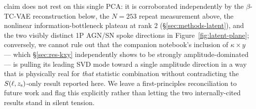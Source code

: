 \documentclass[11pt]{article}
\newcommand{\kappay}{\kappa\times y}
\newcommand{\sez}{S(\ell, z_{\rm s})}
\begin{document}
claim does not rest on this single PCA: it is corroborated independently by
the $\beta$-TC-VAE reconstruction below, the $N=253$ repeat measurement
above, the nonlinear information-bottleneck plateau at rank 2
(\S\ref{sec:methods-latent}), and the two visibly distinct 1P AGN/SN spoke
directions in Figure~\ref{fig:latent-plane}; conversely, we cannot rule out
that the companion notebook's inclusion of $\kappay$ — which
\S\ref{sec:res-kxy} independently shows to be strongly amplitude-dominated —
is pulling its leading SVD mode toward a single amplitude direction in a way
that is physically real for \emph{that} statistic combination without
contradicting the $\sez$-only result reported here. We leave a
first-principles reconciliation to future work and flag this explicitly
rather than letting the two internally-cited results stand in silent
tension.
\end{document}
